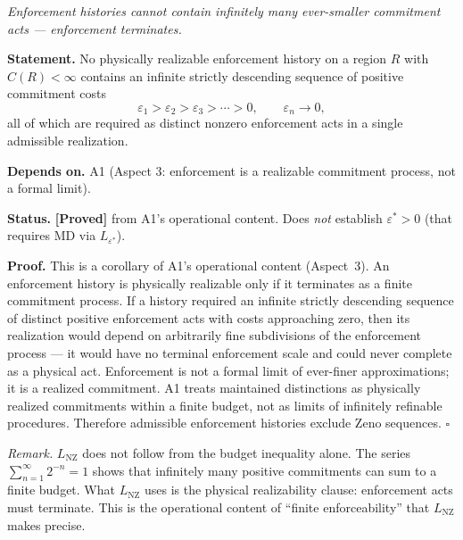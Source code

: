 \documentclass[11pt]{article}
\theoremstyle{remark}
\begin{document}
\begin{tcolorbox}[apfbox, title={Lemma $L_{\mathrm{NZ}}$ (No Zeno Enforcement)}]
\textit{Enforcement histories cannot contain infinitely many ever-smaller commitment acts --- enforcement terminates.}

\smallskip\noindent\textbf{Statement.}  No physically realizable enforcement history on a region $R$ with $C(R) < \infty$ contains an infinite strictly descending sequence of positive commitment costs
\[
\varepsilon_1 > \varepsilon_2 > \varepsilon_3 > \cdots > 0, \qquad \varepsilon_n \to 0,
\]
all of which are required as distinct nonzero enforcement acts in a single admissible realization.

\smallskip\noindent\textbf{Depends on.}  A1 (Aspect 3: enforcement is a realizable commitment process, not a formal limit).

\smallskip\noindent\textbf{Status.}  \textbf{[Proved]} from A1's operational content.  Does \emph{not} establish $\varepsilon^* > 0$ (that requires MD via $L_{\varepsilon^*}$).

\smallskip\noindent\textbf{Proof.}
This is a corollary of A1's operational content (Aspect~3).  An enforcement history is physically realizable only if it terminates as a finite commitment process.  If a history required an infinite strictly descending sequence of distinct positive enforcement acts with costs approaching zero, then its realization would depend on arbitrarily fine subdivisions of the enforcement process --- it would have no terminal enforcement scale and could never complete as a physical act.  Enforcement is not a formal limit of ever-finer approximations; it is a realized commitment.  A1 treats maintained distinctions as physically realized commitments within a finite budget, not as limits of infinitely refinable procedures.  Therefore admissible enforcement histories exclude Zeno sequences.  \hfill$\square$

\smallskip\noindent\textit{Remark.}  $L_{\mathrm{NZ}}$ does not follow from the budget inequality alone.  The series $\sum_{n=1}^\infty 2^{-n} = 1$ shows that infinitely many positive commitments can sum to a finite budget.  What $L_{\mathrm{NZ}}$ uses is the physical realizability clause: enforcement acts must terminate.  This is the operational content of ``finite enforceability'' that $L_{\mathrm{NZ}}$ makes precise.


\end{tcolorbox}
\end{document}
